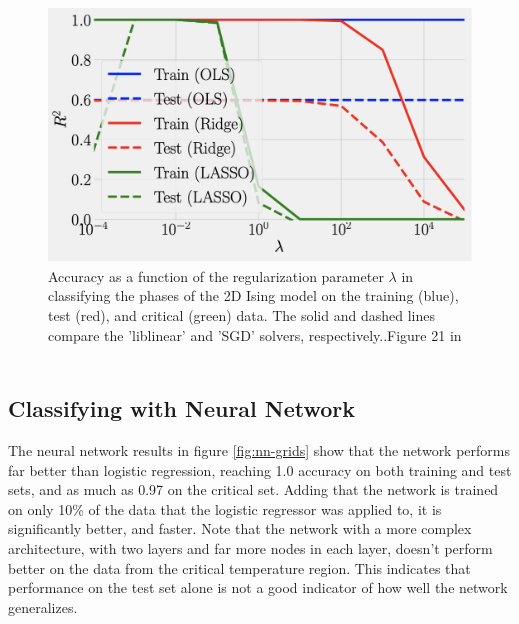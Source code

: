 \begin{figure}[H]
\includegraphics[width = 0.6\paperwidth]{figures/R2_article.png}
\caption{Accuracy as a function of the regularization parameter
\(\lambda\) in classifying the phases of the 2D Ising model on the
training (blue), test (red), and critical (green) data. The solid
and dashed lines compare the ’liblinear’ and ’SGD’ solvers, respectively..Figure 21 in ~\cite{HighBias}} 
\label{fig:logistic-article}
\end{figure}

\subsection{Classifying with Neural Network}
The neural network results in figure \ref{fig:nn-grids} show that the network
performs far better than logistic regression, reaching 1.0 accuracy on both training and
test sets, and as much as 0.97 on the critical set. Adding that the network is trained
on only 10\% of the data that the logistic regressor was applied to, it is significantly better,
and faster.
Note that the network with a more complex architecture, with two layers and far more nodes in 
each layer, doesn't perform better on the data from the critical temperature region. 
This indicates that performance on the test set alone is not a good indicator of how well
the network generalizes.

